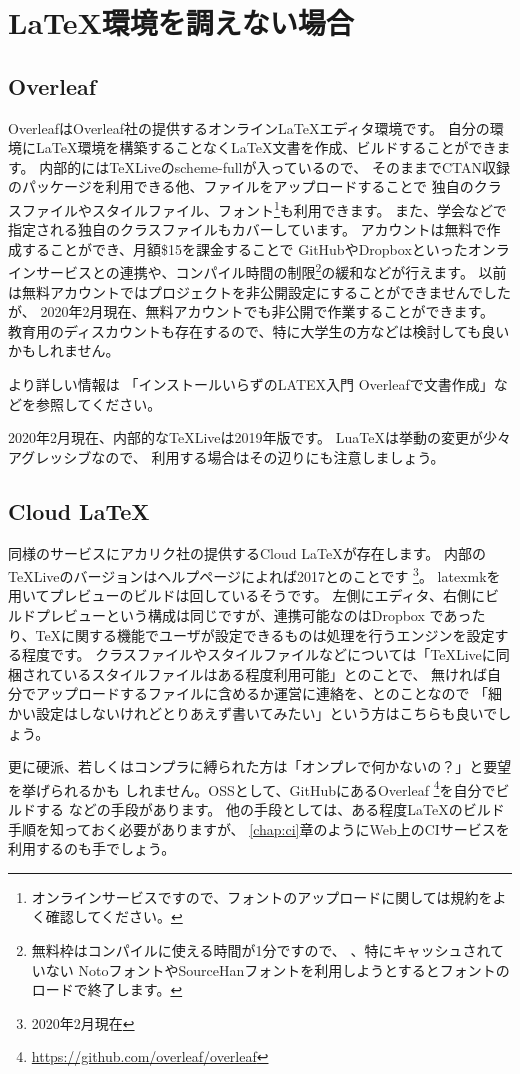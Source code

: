 \documentclass[main]{subfiles}
\begin{document}
\chapter{\LaTeX{}環境を調えない場合}
\begin{abstract}
ローカルの計算機に\LaTeX{}環境を用意するのが面倒、デカい、よく分からないといった場合に
利用できる、\LaTeX{}のためのWebサービスの紹介です。
\end{abstract}

\section{Overleaf}\label{overleaf}
Overleaf\cite{overleaf}はOverleaf社の提供するオンライン\LaTeX{}エディタ環境です。
自分の環境に\LaTeX{}環境を構築することなく\LaTeX{}文書を作成、ビルドすることができます。
内部的には\TeX{}Liveのscheme-fullが入っているので、
そのままでCTAN収録のパッケージを利用できる他、ファイルをアップロードすることで
独自のクラスファイルやスタイルファイル、フォント\footnote{%
オンラインサービスですので、フォントのアップロードに関しては規約をよく確認してください。%
}も利用できます。
また、学会などで指定される独自のクラスファイルもカバーしています。
アカウントは無料で作成することができ、月額\$15を課金することで
GitHubやDropboxといったオンラインサービスとの連携や、コンパイル時間の制限\footnote{%
無料枠はコンパイルに使える時間が1分ですので、%
\LuaLaTeX{}、特にキャッシュされていない
NotoフォントやSourceHanフォントを利用しようとするとフォントのロードで終了します。%
}の緩和などが行えます。
以前は無料アカウントではプロジェクトを非公開設定にすることができませんでしたが、
2020年2月現在、無料アカウントでも非公開で作業することができます。
教育用のディスカウントも存在するので、特に大学生の方などは検討しても良いかもしれません。

より詳しい情報は
「インストールいらずのLATEX入門 Overleafで文書作成\cite{bandou:overleaf}」などを参照してください。

2020年2月現在、内部的な\TeX{}Liveは2019年版です。
Lua\TeX{}は挙動の変更が少々アグレッシブなので、
利用する場合はその辺りにも注意しましょう。

\section{Cloud LaTeX}
同様のサービスにアカリク社の提供するCloud LaTeX\cite{cloudlatex}が存在します。
内部の\TeX{}Liveのバージョンはヘルプページによれば2017とのことです
\footnote{2020年2月現在}。
latexmkを用いてプレビューのビルドは回しているそうです。
左側にエディタ、右側にビルドプレビューという構成は同じですが、連携可能なのはDropbox
であったり、\TeX{}に関する機能でユーザが設定できるものは処理を行うエンジンを設定する程度です。
クラスファイルやスタイルファイルなどについては「\TeX{}Liveに同梱されているスタイルファイルはある程度利用可能」とのことで、
無ければ自分でアップロードするファイルに含めるか運営に連絡を、とのことなので
「細かい設定はしないけれどとりあえず書いてみたい」という方はこちらも良いでしょう。



更に硬派、若しくはコンプラに縛られた方は「オンプレで何かないの？」と要望を挙げられるかも
しれません。OSSとして、GitHubにあるOverleaf
\footnote{\url{https://github.com/overleaf/overleaf}}を自分でビルドする
などの手段があります。
他の手段としては、ある程度\LaTeX{}のビルド手順を知っておく必要がありますが、
\ref{chap:ci}章のようにWeb上のCIサービスを利用するのも手でしょう。
\end{document}
